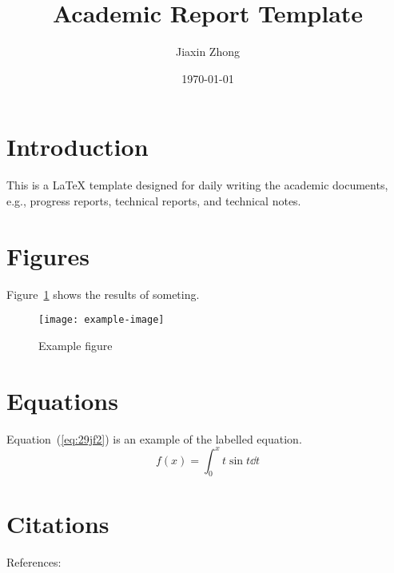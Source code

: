\documentclass{article}
\title{\textbf{Academic Report Template}}
\author{Jiaxin Zhong}
\date{\today}
\begin{document}
\maketitle
\thispagestyle{firststyle}

\section{Introduction}
This is a \LaTeX{} template designed for daily writing the academic documents, e.g., progress reports, technical reports, and technical notes.

\lipsum[1]

\lipsum[2]

\lipsum[3]

\lipsum[4]

\lipsum[5]

\lipsum[6]

\section{Figures}
Figure~\ref{fig:39:f020390} shows the results of someting.
\begin{figure}[!htb]
    \centering
    \texttt{[image: example-image]}
    \caption{Example figure}
    \label{fig:39:f020390}
\end{figure}


\section{Equations}
Equation~(\ref{eq:29jf2}) is an example of the labelled equation.
\begin{equation}
    f(x) = \int_0^x t\sin t \dd t
    \label{eq:29jf2}
\end{equation}

\section{Citations}
References: \cite{Zhong2020InsertionLossThin}





\end{document}
